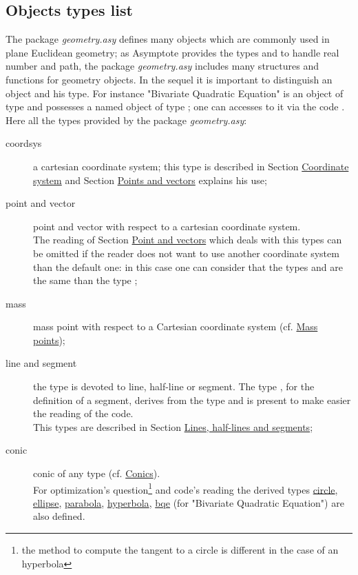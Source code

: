 \documentclass[pdftex]{article}
\newcommand{\geo}{the package \emph{geometry.asy}\xspace}
\newcommand{\Geo}{The package \emph{geometry.asy}\xspace}
\begin{document}
\subsection{Objects types list}
\Geo defines many objects which are commonly used in plane Euclidean geometry;
as Asymptote provides the types  and  to handle real number and
path, \geo includes many structures and functions for geometry objects.
In the sequel it is important to distinguish an object and his type.
For instance  "Bivariate Quadratic Equation" is an object of type 
and possesses a named object  of type ; one can
accesses to it via the code  .\\
Here all the types provided by \geo:
\begin{description}
\item[coordsys] a cartesian coordinate system;
  this type is described in Section
  \href{#section.coordsys}{Coordinate system} and
  Section  \href{#section.point}{Points and vectors} explains his use;
\item[point \textmd{and} vector] point and
  vector with respect to a cartesian coordinate system.\\
   The reading of Section  \href{#section.point}{Point and vectors}
   which deals with this types can be omitted if the reader does not
   want to use another coordinate system than the default one: in this case one
   can consider that the types  and  are the
   same than the type ;
\item[mass] mass point with respect to a Cartesian
  coordinate system   (cf. \href{#section.mass}{Mass points});
\item[line \textmd{and} segment] the type
   is devoted to  line, half-line or  segment.
  The type , for the definition of a segment, derives
  from the type  and is present to make easier the reading
  of the code.\\
  This types are described in Section
  \href{#section.line}{Lines, half-lines and segments};
\item[conic]
  conic of any type (cf. \href{#section.conic}{Conics}).\\
  For optimization's question\footnote{the method to compute the tangent to
    a circle is different in the case of an hyperbola} and code's
  reading the derived types
  \href{#subsection.circle}{circle},
  \href{#subsection.ellipse}{ellipse},
  \href{#subsection.parabola}{parabola},
  \href{#subsection.hyperbola}{hyperbola},
  \href{#subsubsection.bqe}{bqe} (for "Bivariate Quadratic
  Equation") are also defined.


\end{description}
\end{document}
